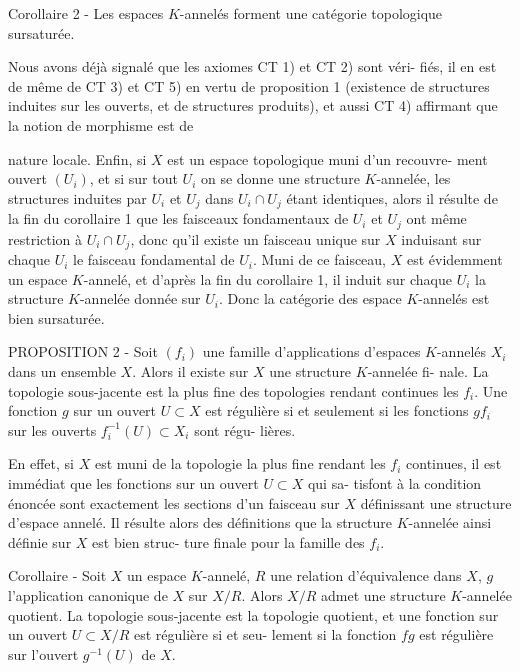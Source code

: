 Corollaire 2 - Les espaces $K$-annelés forment une catégorie topologique
sursaturée.

Nous avons déjà signalé que les axiomes CT 1) et CT 2) sont véri-
fiés, il en est de même de CT 3) et CT 5) en vertu de proposition 1
(existence de structures induites sur les ouverts, et de structures
produits), et aussi CT 4) affirmant que la notion de morphisme est de

\newpage



nature locale. Enfin, si $X$ est un espace topologique muni d'un recouvre-
ment ouvert $(U_i)$, et si sur tout $U_i$ on se donne une structure $K$-annelée,
les structures induites par $U_i$ et $U_j$ dans $U_i \cap U_j$ étant identiques, alors
il résulte de la fin du corollaire 1 que les faisceaux fondamentaux de
$U_i$ et $U_j$ ont même restriction à $U_i \cap U_j$, donc qu'il existe un faisceau
unique sur $X$ induisant sur chaque $U_i$ le faisceau fondamental de $U_i$. Muni
de ce faisceau, $X$ est évidemment un espace $K$-annelé, et d'après la fin
du corollaire 1, il induit sur chaque $U_i$ la structure $K$-annelée donnée
sur $U_i$. Donc la catégorie des espace $K$-annelés est bien sursaturée.

PROPOSITION 2 - Soit $(f_i)$ une famille d'applications d'espaces $K$-annelés
$X_i$ dans un ensemble $X$. Alors il existe sur $X$ une structure $K$-annelée fi-
nale. La topologie sous-jacente est la plus fine des topologies rendant
continues les $f_i$. Une fonction $g$ sur un ouvert $U \subset X$ est régulière si et
seulement si les fonctions $gf_i$ sur les ouverts $f_i^{-1}(U) \subset X_i$ sont régu-
lières.

En effet, si $X$ est muni de la topologie la plus fine rendant les $f_i$
continues, il est immédiat que les fonctions sur un ouvert $U \subset X$ qui sa-
tisfont à la condition énoncée sont exactement les sections d'un faisceau
sur $X$ définissant une structure d'espace annelé. Il résulte alors des
définitions que la structure $K$-annelée ainsi définie sur $X$ est bien struc-
ture finale pour la famille des $f_i$.

Corollaire - Soit $X$ un espace $K$-annelé, $R$ une relation d'équivalence
dans $X$, $g$ l'application canonique de $X$ sur $X/R$. Alors $X/R$ admet une
structure $K$-annelée quotient. La topologie sous-jacente est la topologie
quotient, et une fonction sur un ouvert $U \subset X/R$ est régulière si et seu-
lement si la fonction $fg$ est régulière sur l'ouvert $g^{-1}(U)$ de $X$.


